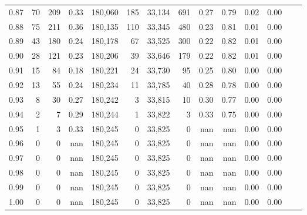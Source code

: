 \begin{tabular}{rrrrrrrrrrrrrr}
0.87 &     70 &  209 &    0.33 &  180,060 &      185 &  33,134 &     691 &  0.27 &  0.79 &  0.02 &      0.00 \\
0.88 &     75 &  211 &    0.36 &  180,135 &      110 &  33,345 &     480 &  0.23 &  0.81 &  0.01 &      0.00 \\
0.89 &     43 &  180 &    0.24 &  180,178 &       67 &  33,525 &     300 &  0.22 &  0.82 &  0.01 &      0.00 \\
0.90 &     28 &  121 &    0.23 &  180,206 &       39 &  33,646 &     179 &  0.22 &  0.82 &  0.01 &      0.00 \\
0.91 &     15 &   84 &    0.18 &  180,221 &       24 &  33,730 &      95 &  0.25 &  0.80 &  0.00 &      0.00 \\
0.92 &     13 &   55 &    0.24 &  180,234 &       11 &  33,785 &      40 &  0.28 &  0.78 &  0.00 &      0.00 \\
0.93 &      8 &   30 &    0.27 &  180,242 &        3 &  33,815 &      10 &  0.30 &  0.77 &  0.00 &      0.00 \\
0.94 &      2 &    7 &    0.29 &  180,244 &        1 &  33,822 &       3 &  0.33 &  0.75 &  0.00 &      0.00 \\
0.95 &      1 &    3 &    0.33 &  180,245 &        0 &  33,825 &       0 &   nan &   nan &  0.00 &      0.00 \\
0.96 &      0 &    0 &     nan &  180,245 &        0 &  33,825 &       0 &   nan &   nan &  0.00 &      0.00 \\
0.97 &      0 &    0 &     nan &  180,245 &        0 &  33,825 &       0 &   nan &   nan &  0.00 &      0.00 \\
0.98 &      0 &    0 &     nan &  180,245 &        0 &  33,825 &       0 &   nan &   nan &  0.00 &      0.00 \\
0.99 &      0 &    0 &     nan &  180,245 &        0 &  33,825 &       0 &   nan &   nan &  0.00 &      0.00 \\
1.00 &      0 &    0 &     nan &  180,245 &        0 &  33,825 &       0 &   nan &   nan &  0.00 &      0.00 \\
\bottomrule
\end{tabular}
